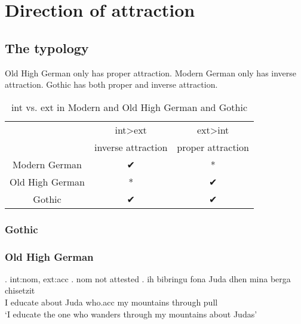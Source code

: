 
\chapter{Direction of attraction}



\section{The typology}
Old High German only has proper attraction. Modern German only has inverse attraction. Gothic has both proper and inverse attraction.


\begin{table}[h]
	\center
	\caption {\ac{int} vs. \ac{ext} in Modern and Old High German and Gothic}
		\begin{tabular}{ccc}
		\toprule
		 								& \ac{int}>\ac{ext}		& \ac{ext}>\ac{int}				\\
										& inverse attraction	& proper attraction		\\
										\cmidrule{2-3}
		Modern German 	& ✔			 							&	*										\\
		Old High German	& *										&	✔										\\
		Gothic					&	✔										&	✔										\\
		\bottomrule
		\end{tabular}
\end{table}



\subsection{Gothic}





\subsection{Old High German}


\ex. \ac{int}:\ac{nom}, \ac{ext}:\ac{acc}
\a. \ac{nom} not attested
\bg. ih bibringu fona Juda dhen mina berga chisetzit\\
 I educate\scsub{[acc]} about Juda who.\ac{acc} my mountains {through pull}\scsub{[nom]}\\
 `I educate the one who wanders through my mountains about Judas' 

